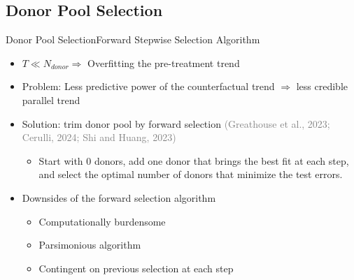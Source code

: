 \documentclass{beamer}
\theoremstyle{definition}
\begin{document}


\subsection{Donor Pool Selection}




\begin{frame}{Donor Pool Selection}{Forward Stepwise Selection Algorithm}

\begin{itemize}
\setlength{\itemsep}{18pt}
    \item $T \ll N_{donor} \Rightarrow$ Overfitting the pre-treatment trend %
    \item Problem: Less predictive power of the counterfactual trend $\Rightarrow$ less credible parallel trend
    \item Solution: trim donor pool by forward selection \textcolor{gray}{(Greathouse et al., 2023; Cerulli, 2024; Shi and Huang, 2023)}
    \begin{itemize}
    \setlength{\itemsep}{8pt}
        \item Start with 0 donors, add one donor that brings the best fit at each step, and select the optimal number of donors that minimize the test errors. 
    \end{itemize}
    \item Downsides of the forward selection algorithm
    \begin{itemize}
    \setlength{\itemsep}{8pt}
        \item Computationally burdensome %
        \item Parsimonious algorithm
        \item Contingent on previous selection at each step %
    \end{itemize}
\end{itemize}
    
\end{frame}
\end{document}
